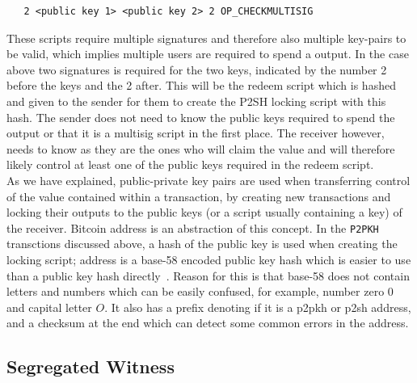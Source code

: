 \begin{verbatim}
   2 <public key 1> <public key 2> 2 OP_CHECKMULTISIG
\end{verbatim}

These scripts require multiple signatures and therefore also multiple key-pairs to be valid, which implies multiple users are required to spend a output.
In the case above two signatures is required for the two keys, indicated by the number 2 before the keys and the 2 after.
This will be the redeem script which is hashed and given to the sender for them to create the P2SH locking script with this hash.
The sender does not need to know the public keys required to spend the output or that it is a multisig script in the first place. The receiver however, needs to know as they are the ones who will claim the value and will therefore likely control at least one of the public keys required in the redeem script.
\\

As we have explained, public-private key pairs are used when transferring  control of the value contained within a transaction, by creating new transactions and locking their outputs to the public keys (or a script usually containing a key) of the receiver. Bitcoin address is an abstraction of this concept. In the {\tt P2PKH} transctions discussed above, a hash of the public key is used when creating the locking script; address is a base-58 encoded public key hash which is easier to use than a public key hash directly~\cite{antonopoulos2017mastering}. Reason for this is that base-58 does not contain letters and numbers which can be easily confused, for example, number zero $0$ and capital letter $O$. It also has a prefix denoting if it is a p2pkh or p2sh address, and a checksum at the end which can detect some common errors in the address.

\subsection{Segregated Witness}
\label{subsec:segwit}

